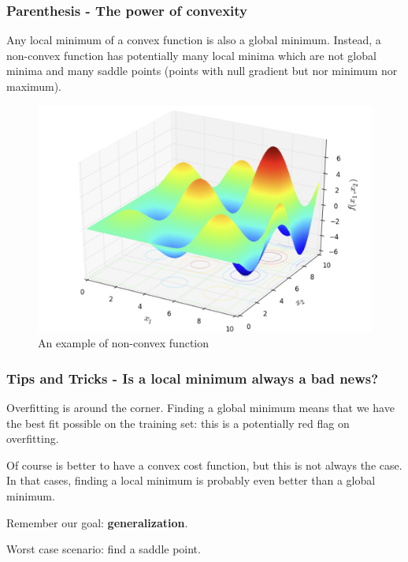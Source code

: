 \documentclass{beamer}
\begin{document}
	\begin{frame}
		\frametitle{Parenthesis - The power of convexity}
		Any local minimum of a convex function is also a global minimum. 
		Instead, a non-convex function has potentially many local minima which are not global minima and many saddle points (points with null gradient but nor minimum nor maximum).
		
		\begin{figure}
			\centering
			\includegraphics[scale=0.3]{images/non_convex}
			\caption{An example of non-convex function}
		\end{figure}
	\end{frame}

	\begin{frame}
		\frametitle{Tips and Tricks - Is a local minimum always a bad news?}
		
		Overfitting is around the corner. Finding a global minimum means that we have the best fit possible on the training set: this is a potentially red flag on overfitting.
		
		\vspace{5mm}
		
		Of course is better to have a convex cost function, but this is not always the case. In that cases, finding a local minimum is probably even better than a global minimum. 
		
		Remember our goal: \textbf{generalization}.
		
		\vspace{5mm}
		
		Worst case scenario: find a saddle point.
		
		
	\end{frame}
\end{document}
